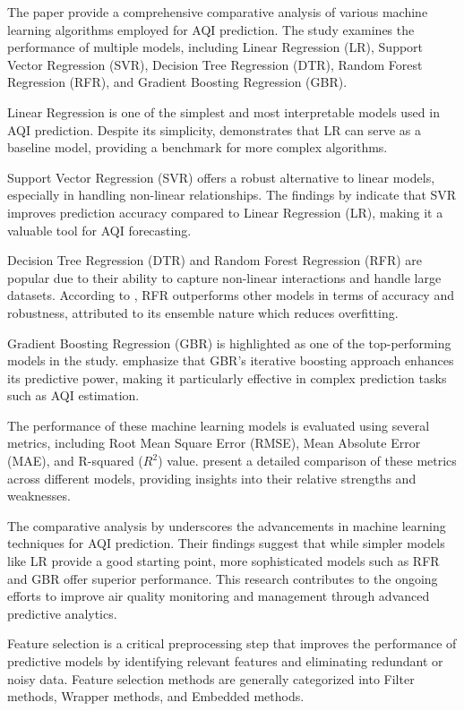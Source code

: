 \documentclass{book}
\numberwithin{equation}{section}
\numberwithin{figure}{section}
\begin{document}
The paper \citep{gupta2023} provide a comprehensive comparative analysis of various machine learning algorithms employed for AQI prediction. The study examines the performance of multiple models, including Linear Regression (LR), Support Vector Regression (SVR), Decision Tree Regression (DTR), Random Forest Regression (RFR), and Gradient Boosting Regression (GBR).

Linear Regression is one of the simplest and most interpretable models used in AQI prediction. Despite its simplicity, \citep{gupta2023} demonstrates that LR can serve as a baseline model, providing a benchmark for more complex algorithms.

Support Vector Regression (SVR) offers a robust alternative to linear models, especially in handling non-linear relationships. The findings by \citep{gupta2023} indicate that SVR improves prediction accuracy compared to Linear Regression (LR), making it a valuable tool for AQI forecasting.

Decision Tree Regression (DTR) and Random Forest Regression (RFR) are popular due to their ability to capture non-linear interactions and handle large datasets. According to \citep{gupta2023}, RFR outperforms other models in terms of accuracy and robustness, attributed to its ensemble nature which reduces overfitting.

Gradient Boosting Regression (GBR) is highlighted as one of the top-performing models in the study. \citep{gupta2023} emphasize that GBR's iterative boosting approach enhances its predictive power, making it particularly effective in complex prediction tasks such as AQI estimation.

The performance of these machine learning models is evaluated using several metrics, including Root Mean Square Error (RMSE), Mean Absolute Error (MAE), and R-squared ($R^2$) value. \citep{gupta2023} present a detailed comparison of these metrics across different models, providing insights into their relative strengths and weaknesses.

The comparative analysis by \citep{gupta2023} underscores the advancements in machine learning techniques for AQI prediction. Their findings suggest that while simpler models like LR provide a good starting point, more sophisticated models such as RFR and GBR offer superior performance. This research contributes to the ongoing efforts to improve air quality monitoring and management through advanced predictive analytics.

Feature selection is a critical preprocessing step that improves the performance of predictive models by identifying relevant features and eliminating redundant or noisy data. Feature selection methods are generally categorized into Filter methods, Wrapper methods, and Embedded methods.
\end{document}
